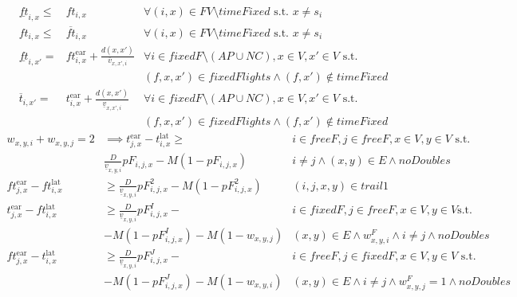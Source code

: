 \documentclass[../thesis.tex]{subfiles}
\begin{document}
{\begin{align}
\end{align}
\begin{align}
    \underline{ft}_{i,x} \leq& ft_{i,x} &\forall (i,x)\in FV\setminus timeFixed \text{ s.t. } x\neq s_i\\
    ft_{i,x} \leq& \overline{ft}_{i,x} &\forall (i,x)\in FV\setminus timeFixed \text{ s.t. } x\neq s_i\\
    \underline {ft}_{i,x'}=&ft^\text{ear}_{i,x}+\frac{d(x,x')}{\overline v_{x,x',i}}
    &\forall i\in fixedF\setminus (AP\cup NC),x\in V, x'\in V \text{ s.t. }\nonumber\\ &&(f,x,x')\in fixedFlights\land (f,x')\notin timeFixed\\
    \overline t_{i,x'}=&t^\text{ear}_{i,x}+\frac{d(x,x')}{\underline v_{x,x',i}}
    &\forall i\in fixedF\setminus (AP\cup NC),x\in V, x'\in V \text{ s.t. }\nonumber\\ &&(f,x,x')\in fixedFlights\land (f,x')\notin timeFixed
\end{align}
\begin{align}
w_{x,y,i} + w_{x,y,j} = 2& \implies t^\text{ear}_{j,x}-t^\text{lat}_{i,x} \geq& i\in freeF,j \in freeF,x\in V,y \in V\text{ s.t. } \nonumber\\& \frac D{\underline v_{x,y,i}} pF_{i,j,x} - M(1-pF_{i,j,x}) 
& i\neq j \land (x,y)\in E\land noDoubles\\
ft^\text{ear}_{j,x}-ft^\text{lat}_{i,x}&\geq \frac D {\underline v_{x,y,i}}pF^2_{i,j,x} - M(1-pF^2_{i,j,x}) & (i,j,x,y)\in trail1\\
t^\text{ear}_{j,x}- ft^\text{lat}_{i,x} &\geq \frac D{\underline v_{x,y,i}} pF^I_{i,j,x} - &
i \in fixedF,j\in freeF,x\in V,y\in V\text{s.t.}\nonumber\\&-M (1-pF^I_{i,j,x}) - M(1-w_{x,y,j})&
(x,y)\in E\land  w^F_{x,y,i}\land i\neq j\land noDoubles\\
ft^\text{ear}_{j,x}-t^\text{lat}_{i,x}&\geq \frac D{\underline v_{x,y,i}} pF^J_{i,j,x} - & i\in freeF,j \in fixedF,x\in V,y\in V\text{ s.t. }
\nonumber\\&
-M (1-pF^J_{i,j,x}) -M (1-w_{x,y,i})
& (x,y)\in E\land i\neq j\land w^F_{x,y,j}=1\land noDoubles\\

\end{align}}
\end{document}
